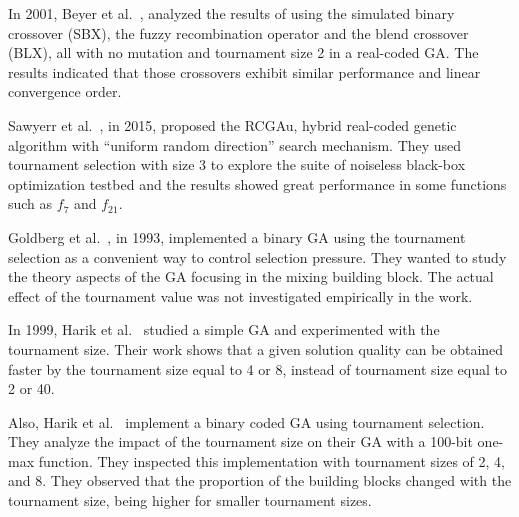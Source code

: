 


In 2001, Beyer et al.~\cite{beyer2001self}, analyzed the results of using the simulated binary crossover (SBX), the fuzzy recombination operator and the blend crossover (BLX), all with no mutation and tournament size 2 in a real-coded GA. The results indicated that those crossovers exhibit similar performance and linear convergence order.


Sawyerr et al.~\cite{sawyerr2015benchmarking}, in 2015, proposed the RCGAu, hybrid real-coded genetic algorithm with ``uniform random direction'' search mechanism. They used tournament selection with size 3 to explore the suite of noiseless black-box optimization testbed and the results showed great performance in some functions such as $f_7$ and $f_{21}$.

Goldberg et al.~\cite{goldberg1993toward}, in 1993, implemented a binary GA using the tournament selection as a convenient way to control selection pressure. They wanted to study the theory aspects of the GA focusing in the mixing building block. The actual effect of the tournament value was not investigated empirically in the work.

In 1999, Harik et al.~\cite{harik1999compact} studied a simple GA and experimented with the tournament size. Their work shows that a given solution quality can be obtained faster by the tournament size equal to 4 or 8, instead of tournament size equal to 2 or 40. 

Also, Harik et al.~\cite{harik1999gambler} implement a binary coded GA using tournament selection. They analyze the impact of the tournament size on their GA with a 100-bit one-max function. They inspected this implementation with tournament sizes of 2, 4, and 8. They observed that the proportion of the building blocks changed with the tournament size, being higher for smaller tournament sizes.

